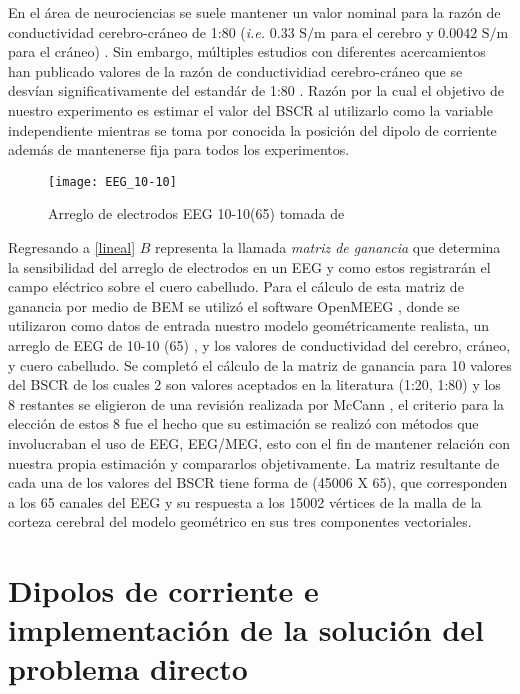 En el área de neurociencias se suele mantener un valor nominal para la razón de conductividad cerebro-cráneo de 1:80 (\emph{i.e.} $0.33\text{ S/m}$ para el cerebro y $0.0042 \text{ S/m}$ para el cráneo) \cite{Rush1968,Rush1969,Cohen1983}. Sin embargo, múltiples estudios con diferentes acercamientos han publicado valores de la razón de conductividiad cerebro-cráneo que se desvían significativamente del estandár de 1:80 \cite{McCann2019}. Razón por la cual el objetivo de nuestro experimento es estimar el valor del BSCR al utilizarlo como la variable independiente mientras se toma por conocida la posición del dipolo de corriente además de mantenerse fija para todos los experimentos.

\begin{figure}[tb]
	\centering
	\texttt{[image: EEG\_10-10]}
	\caption{Arreglo de electrodos EEG 10-10(65) tomada de \cite{krolEnglishEEGElectrode2020}}
	\label{fig:EEG10-10}
\end{figure}

Regresando a \cref{lineal} $B$ representa la llamada \emph{matriz de ganancia} que determina la sensibilidad del arreglo de electrodos en un EEG y como estos registrarán el campo eléctrico sobre el cuero cabelludo. Para el cálculo de esta matriz de ganancia por medio de BEM se utilizó el software OpenMEEG \cite{open,open2}, donde se utilizaron como datos de entrada nuestro modelo geométricamente realista, un arreglo de EEG de 10-10 (65) , y los valores de conductividad del cerebro, cráneo, y cuero cabelludo. Se completó el cálculo de la matriz de ganancia para 10  valores del BSCR de los cuales 2 son valores aceptados en la literatura (1:20, 1:80) y los 8 restantes se eligieron de una revisión realizada por McCann \cite{McCann2019}, el criterio para la elección de estos 8 fue el hecho que su estimación se realizó con métodos que involucraban el uso de EEG, EEG/MEG, esto con el fin de mantener relación con nuestra propia estimación y compararlos objetivamente. La matriz resultante de cada una de los valores del BSCR tiene forma de (45006 X 65), que corresponden a los 65 canales del EEG y su respuesta a los 15002 vértices de la malla de la corteza cerebral del modelo geométrico en sus tres componentes vectoriales.

\section{Dipolos de corriente e implementación de la solución del problema directo}
\label{sec:methodology:direct_solved}


